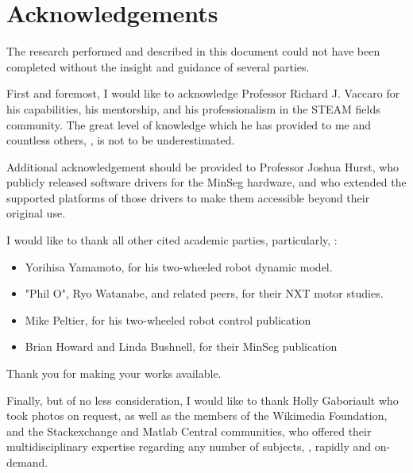 \documentclass[crop=false,float=true,class=scrreprt]{standalone}
\begin{document}
\chapter*{Acknowledgements}

The research performed and described in this document 
could not have been completed
without the insight and guidance of several parties.

First and foremost,
I would like to acknowledge Professor Richard J. Vaccaro
for his capabilities, his mentorship, and his professionalism in the STEAM fields community.
The great level of knowledge which he has provided to me and countless others,
{\fns{}},
is not to be underestimated.

Additional acknowledgement should be provided to
Professor Joshua Hurst,
who publicly released software drivers for the MinSeg hardware,
and who extended the supported platforms of those drivers
to make them accessible beyond their original use.

I would like to thank all other cited academic parties, particularly, {}:

\begin{itemize}[leftmargin=*, itemsep=-1em,label=$\cdot$]
\item Yorihisa Yamamoto, for his two-wheeled robot dynamic model.
\item "Phil O", Ryo Watanabe, and related peers, for their NXT motor studies.
\item Mike Peltier, for his two-wheeled robot control publication
\item Brian Howard and Linda Bushnell, for their MinSeg publication
\end{itemize}

Thank you for making your works available.

Finally, but of no less consideration, I would like to thank
Holly Gaboriault
who took photos on request, as well as
the members of the Wikimedia Foundation, and
the Stackexchange and Matlab Central communities,
who offered their multidisciplinary expertise regarding any number of subjects,
{\fns{}}, rapidly and on-demand.
\end{document}

